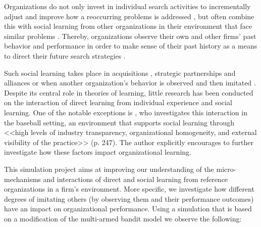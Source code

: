 Organizations do not only invest in individual search activities to incrementally adjust and improve how a reoccurring problems is addressed \citep{Greve2003_Organizational-Learning-From-Performance-Feedback, March1991_Exploration-and-Exploitation_OS}, but often combine this with social learning from other organizations in their environment that face similar problems \citep{BaumLi2000_Making-the-Next-Move:-How-Experiential-and-Vicarious_ASQ, MinerHaunschild1995_Population-level-learning, Schwab2007_Incremental-Organizational-Learning-from-Multilevel-Info_OS}. Thereby, organizations observe their own and other firms' past behavior and performance in order to make sense of their past history as a means to direct their future search strategies \citep{MarchSproull1991_Learning-From-Samples-of-One-or-Fewer_OS}. 

Such social learning takes place in acquisitions \citep{BeckmanHaunschild2002_Network-Learning-The-Effects-of-Partners-Heterogeneity_ASQ, VermeulenBarkema2001_Learning-through-Acquisitions_AMJ}, strategic partnerships and alliances \citep{BorgattiCross2003_A-Relational-View-of-Information-Seeking_MS, Gulati1999_Network-location-and-learning_SMJ, HeimeriksDuysters2007_Alliance-Capability-as-a-Mediator-Between-Exp, inkpen1998, LaneLubatkin1998_Relative-absorptive-capacity-and-interorganiztional-learning_SMJ, MuthusamyWhite2005_Learning-and-Knowledge-Transfer-in-Strategic_OS} or when another organization's behavior is observed and then imitated \citep{posenchen2013_an-advantage-of-newness:-vi}. 
Despite its central role in theories of learning, little research has been conducted on the interaction of direct learning from individual experience and social learning. One of the notable exceptions is \citet{Schwab2007_Incremental-Organizational-Learning-from-Multilevel-Info_OS}, who investigates this interaction in the baseball setting, an environment that supports social learning through <<high levels of industry transparency, organizational homogeneity, and external visibility of the practice>> (p. 247). The author explicitly encourages to further investigate how these factors impact organizational learning. 

This simulation project aims at improving our understanding of the micro-mechanisms and interactions of direct and social learning from reference organizations in a firm's environment. More specific, we investigate how different degrees of imitating others (by observing them and their performance outcomes) have an impact on organizational performance. Using a simulation that is based on a modification of the multi-armed bandit model we observe the following:

